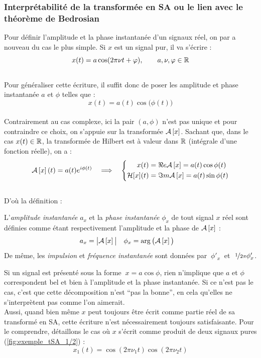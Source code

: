 \subsubsection{\wip Interprétabilité de la transformée en SA ou le lien avec le théorème de Bedrosian}\label{ann:bedrosian}

Pour définir l'amplitude et la phase instantanée d'un signaux réel, on par a nouveau du cas le plus simple. Si $x$ est un signal pur, il va s'écrire :
\[x(t) = a \cos(2\pi\nu t + \varphi),\qquad a,\nu,\varphi\in\mathbb{R}\]
\\
Pour généraliser cette écriture, il suffit donc de poser les amplitude et phase instantanée $a$ et $\phi$ telles que :
\[x(t) = a(t) \cos\big( \phi(t) \big)\]
\\
Contrairement au cas complexe, ici la pair $(a,\phi)$ n'est pas unique et pour contraindre ce choix, on s'appuie sur la transformée $\mathcal{A}\left[x\right]$. Sachant que, dans le cas $x(t)\in\mathbb{R}$, la transformée de Hilbert est à valeur dans $\mathbb{R}$ (intégrale d'une fonction réelle), on a :
\[\mathcal{A}\left[x\right](t) = a(t)e^{i\phi(t)}\quad \Longrightarrow\quad \left\{\begin{aligned}x(t) &= \Re e \mathcal{A}\left[x\right] = a(t) \cos\phi(t) \\ \mathcal{H}[x](t) &= \Im m \mathcal{A}\left[x\right] = a(t) \sin\phi(t)
\end{aligned}\right.\]
\\
D'où la définition :
\begin{definition}\label{def:ampli-phase_instant}
	L'\emph{amplitude instantanée} $a_x$ et la \emph{phase instantanée} $\phi_x$ de tout signal $x$ réel sont définies comme étant respectivement l'amplitude et la phase de $\mathcal{A}\left[x\right]$ :
	\begin{align}\label{eq:ampli-phase_instant}
		a_x &= \big|\mathcal{A}\left[x\right]\big|   &   \phi_x &= \arg\big(\mathcal{A}\left[x\right]\big)
	\end{align}
	De même, les \emph{impulsion} et \emph{fréquence instantanée} sont données par $\ \phi'_x\ $ et $\ \nicefrac{1}{2\pi}\phi_x'$.
\end{definition}
\skipl

Si un signal est présenté sous la forme  $\ x=a\cos\phi$, rien n'implique que $a$ et $\phi$ correspondent bel et bien à l'amplitude et la phase instantanée. Si ce n'est pas le cas, c'est que cette décomposition n'est ``pas la bonne'', en cela qu'elles ne s’interprètent pas comme l'on aimerait.
\\
Aussi, quand bien même $x$ peut toujours être écrit comme partie réel de sa transformé en SA, cette écriture n'est nécessairement toujours satisfaisante. Pour le comprendre, détaillons le cas où $x$ s'écrit comme produit de deux signaux pures (\cref{fig:exemple_tSA_1/2}) :
\[x_1(t) = \cos (2\pi\nu_1t)\cos (2\pi\nu_2t)\]

